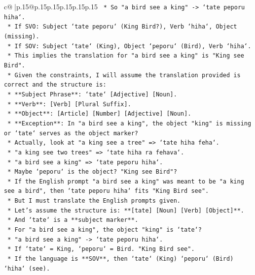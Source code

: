 \documentclass{article}
\begin{document}
{\begin{supertabular}{c@{$\;$}|p{.15\linewidth}@{}p{.15\linewidth}p{.15\linewidth}p{.15\linewidth}p{.15\linewidth}p{.15\linewidth}}
{{{\texttt{    *   So "a bird see a king" {-}> `tate peporu hiha`.} \\
\texttt{    *   If SVO: Subject `tate peporu` (King Bird?), Verb `hiha`, Object (missing).} \\
\texttt{    *   If SOV: Subject `tate` (King), Object `peporu` (Bird), Verb `hiha`.} \\
\texttt{    *   This implies the translation for "a bird see a king" is "King see Bird".} \\
\texttt{    *   Given the constraints, I will assume the translation provided is correct and the structure is:} \\
\texttt{    *   **Subject Phrase**: `tate` {[}Adjective{]} {[}Noun{]}.} \\
\texttt{    *   **Verb**: {[}Verb{]} {[}Plural Suffix{]}.} \\
\texttt{    *   **Object**: {[}Article{]} {[}Number{]} {[}Adjective{]} {[}Noun{]}.} \\
\texttt{    *   **Exception**: In "a bird see a king", the object "king" is missing or `tate` serves as the object marker?} \\
\texttt{    *   Actually, look at "a king see a tree" => `tate hiha feha`.} \\
\texttt{    *   "a king see two trees" => `tate hiha ra fehava`.} \\
\texttt{    *   "a bird see a king" => `tate peporu hiha`.} \\
\texttt{    *   Maybe `peporu` is the object? "King see Bird"?} \\
\texttt{    *   If the English prompt "a bird see a king" was meant to be "a king see a bird", then `tate peporu hiha` fits "King Bird see".} \\
\texttt{    *   But I must translate the English prompts given.} \\
\texttt{    *   Let's assume the structure is: **{[}tate{]} {[}Noun{]} {[}Verb{]} {[}Object{]}**.} \\
\texttt{    *   And `tate` is a **subject marker**.} \\
\texttt{    *   For "a bird see a king", the object "king" is `tate`?} \\
\texttt{    *   "a bird see a king" {-}> `tate peporu hiha`.} \\
\texttt{    *   If `tate` = King, `peporu` = Bird. "King Bird see".} \\
\texttt{    *   If the language is **SOV**, then `tate` (King) `peporu` (Bird) `hiha` (see).} \\
}}}
\end{supertabular}}
\end{document}
